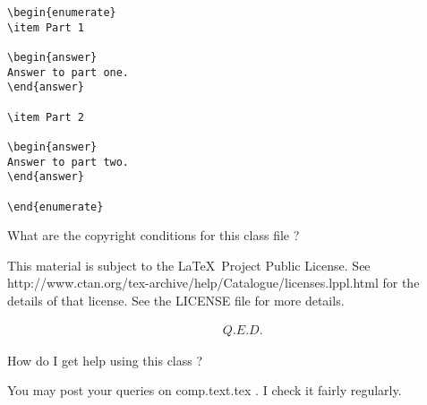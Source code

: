 \documentclass{assignment}
\begin{document}
\begin{problemlist}
\begin{problem}
\begin{verbatim}
\begin{enumerate}
\item Part 1

\begin{answer}
Answer to part one.
\end{answer}

\item Part 2

\begin{answer}
Answer to part two.
\end{answer}

\end{enumerate}

\end{verbatim}

\end{problem}


\pbitem What are the copyright conditions for this class file ?

\begin{problem}

This material is subject to the \LaTeX\ Project Public License. See http://www.ctan.org/tex-archive/help/Catalogue/licenses.lppl.html for the details of that license. See the LICENSE file for more details.


\begin{answer}
\begin{eqnarray}
&& Q. E. D. \nonumber
\end{eqnarray}
\end{answer}

\end{problem}


\pbitem How do I get help using this class ?
\begin{problem}


You may post your queries on comp.text.tex . I check it fairly regularly.
\end{problem}

\end{problemlist}
\end{document}
